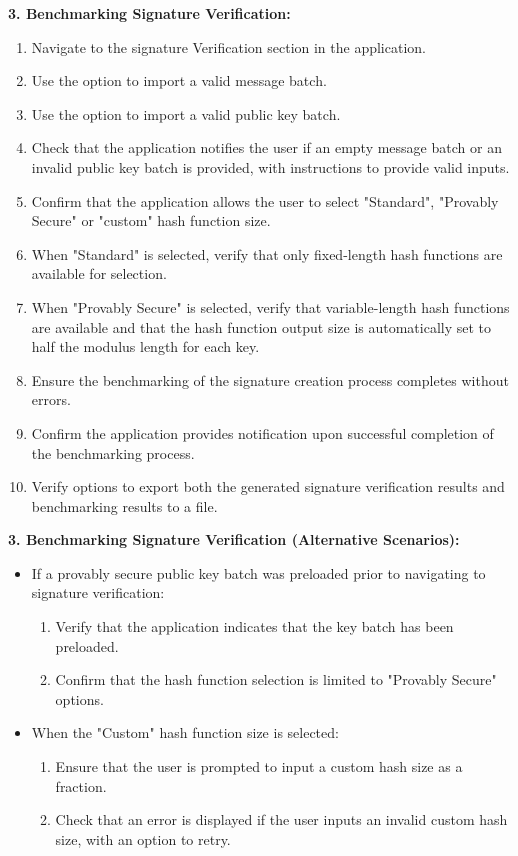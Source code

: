 \documentclass[]{final_report}
\theoremstyle{definition}
\begin{document}
\textbf{3. Benchmarking Signature Verification:}
\begin{enumerate}
    \item Navigate to the signature Verification section in the application.
    \item Use the option to import a valid message batch.
    \item Use the option to import a valid public key batch.
    \item Check that the application notifies the user if an empty message batch or an invalid public key batch is provided, with instructions to provide valid inputs.
    \item Confirm that the application allows the user to select "Standard", "Provably Secure" or "custom" hash function size.
    \item When "Standard" is selected, verify that only fixed-length hash functions are available for selection.
    \item When "Provably Secure" is selected, verify that variable-length hash functions are available and that the hash function output size is automatically set to half the modulus length for each key.
    \item Ensure the benchmarking of the signature creation process completes without errors.
    \item Confirm the application provides notification upon successful completion of the benchmarking process.
\item Verify options to export both the generated signature verification results and benchmarking results to a file.
\end{enumerate}

\textbf{3. Benchmarking Signature Verification (Alternative Scenarios):}

\begin{itemize}
    \item If a provably secure public key batch was preloaded prior to navigating to signature verification:
    \begin{enumerate}
        \item Verify that the application indicates that the key batch has been preloaded.
        \item Confirm that the hash function selection is limited to "Provably Secure" options.
    \end{enumerate}
    \item When the "Custom" hash function size is selected:
    \begin{enumerate}
        \item Ensure that the user is prompted to input a custom hash size as a fraction.
        \item Check that an error is displayed if the user inputs an invalid custom hash size, with an option to retry.
    \end{enumerate}
\end{itemize}
\end{document}
